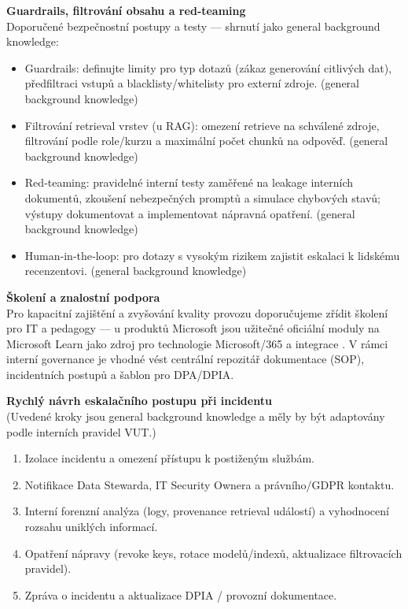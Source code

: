 \documentclass{report}%
\begin{document}
\medskip

\textbf{Guardrails, filtrování obsahu a red‑teaming} \\
Doporučené bezpečnostní postupy a testy — shrnutí jako general background knowledge:
\begin{itemize}
  \item Guardrails: definujte limity pro typ dotazů (zákaz generování citlivých dat), předfiltraci vstupů a blacklisty/whitelisty pro externí zdroje. (general background knowledge)
  \item Filtrování retrieval vrstev (u RAG): omezení retrieve na schválené zdroje, filtrování podle role/kurzu a maximální počet chunků na odpověď. (general background knowledge)
  \item Red‑teaming: pravidelné interní testy zaměřené na leakage interních dokumentů, zkoušení nebezpečných promptů a simulace chybových stavů; výstupy dokumentovat a implementovat nápravná opatření. (general background knowledge)
  \item Human‑in‑the‑loop: pro dotazy s vysokým rizikem zajistit eskalaci k lidskému recenzentovi. (general background knowledge)
\end{itemize}

\medskip

\textbf{Školení a znalostní podpora} \\
Pro kapacitní zajištění a zvyšování kvality provozu doporučujeme zřídit školení pro IT a pedagogy — u produktů Microsoft jsou užitečné oficiální moduly na Microsoft Learn jako zdroj pro technologie Microsoft/365 a integrace \cite{kb_ai_101_tipu_pdf_04e4a115_page_54_1}. V rámci interní governance je vhodné vést centrální repozitář dokumentace (SOP), incidentních postupů a šablon pro DPA/DPIA.

\medskip

\textbf{Rychlý návrh eskalačního postupu při incidentu} \\
(Uvedené kroky jsou general background knowledge a měly by být adaptovány podle interních pravidel VUT.)
\begin{enumerate}
  \item Izolace incidentu a omezení přístupu k postiženým službám.
  \item Notifikace Data Stewarda, IT Security Ownera a právního/GDPR kontaktu.
  \item Interní forenzní analýza (logy, provenance retrieval událostí) a vyhodnocení rozsahu uniklých informací.
  \item Opatření nápravy (revoke keys, rotace modelů/indexů, aktualizace filtrovacích pravidel).
  \item Zpráva o incidentu a aktualizace DPIA / provozní dokumentace. 
\end{enumerate}
\end{document}

